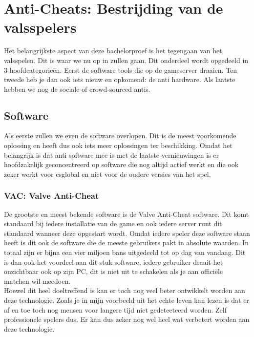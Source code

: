 \documentclass[pdftex,a4paper,12pt,twoside]{report}
\begin{document}
\chapter{Anti-Cheats: Bestrijding van de valsspelers}
\label{ch:antis}
Het belangrijkste aspect van deze bachelorproef is het tegengaan van het valsspelen. Dit is waar we nu op in zullen gaan. Dit onderdeel wordt opgedeeld in 3 hoofdcategorieën. Eerst de software tools die op de gameserver draaien. Ten tweede heb je dan ook iets nieuw en opkomend: de \gls{anti} hardware. Als laatste hebben we nog de sociale of crowd-sourced \gls{anti}s.

\section{Software}
\label{sec:antisoftware}
Als eerste zullen we even de software overlopen. Dit is de meest voorkomende oplossing en heeft dus ook iets meer oplossingen ter beschikking. Omdat het belangrijk is dat \gls{anti} software mee is met de laatste vernieuwingen is er hoofdzakelijk geconcentreerd op software die nog altijd actief werkt en die ook zeker werkt voor \gls{csglobal} en niet voor de oudere versies van het spel. 

\subsection{VAC: Valve Anti-Cheat}
\label{sec:vac}
De grootste en meest bekende software is de Valve Anti-Cheat software. Dit komt standaard bij iedere installatie van de game en ook iedere server runt dit standaard wanneer deze opgestart wordt. \citep{VAC}Omdat iedere speler deze software staan heeft is dit ook de software die de meeste gebruikers pakt in absolute waarden. In totaal zijn er bijna een vier miljoen bans uitgedeeld tot op dag van vandaag. Dit is dan ook het voordeel aan dit stuk software, iedere gebruiker draait het onzichtbaar ook op zijn PC, dit is niet uit te schakelen als je aan officiële matchen wil meedoen.
\citep{steamdb}
\\

Hoewel dit heel doeltreffend is kan er toch nog veel beter ontwikkelt worden aan deze technologie. Zoals je in mijn voorbeeld uit het echte leven kan lezen is dat er af en toe toch nog mensen voor langere tijd niet gedetecteerd worden. Zelf professionele spelers dus. Er kan dus zeker nog wel heel wat verbetert worden aan deze technologie. 
\\
\end{document}
